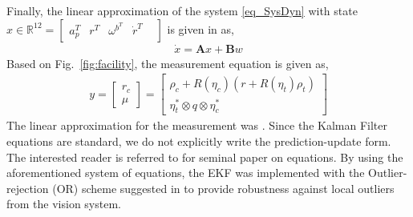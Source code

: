 Finally,  the linear approximation of the  system \eqref{eq_SysDyn} with state $x \in \mathbb{R}^{12} = \begin{bmatrix}a_p^T&r^T&\omega^{b^T}&\dot{r}^T & \end{bmatrix}$ is given in \cite[eq. 4.79]{TweddlePhD} as,
\begin{align}
\dot{x} = \mathbf{A}x + \mathbf{B}w
\end{align}
Based on Fig.~\ref{fig:facility}, the measurement equation is given as,
\begin{align}
y = \begin{bmatrix}
r_c \\ \mu \end{bmatrix} = \begin{bmatrix}
\rho_c + R(\eta_c)(r + R(\eta_t)\rho_t) \\
\eta_t^*\otimes q \otimes \eta_c^*
\end{bmatrix}
\end{align}
The linear approximation for the measurement was 
. Since the Kalman Filter equations are standard, we do not explicitly write the prediction-update form. The interested reader is referred to \cite{Kalman} for seminal paper on equations. By using the aforementioned system of equations, the EKF was implemented with the Outlier-rejection (OR) scheme suggested in \cite{Selfpaper} to provide robustness against local outliers from the vision system. 
%
